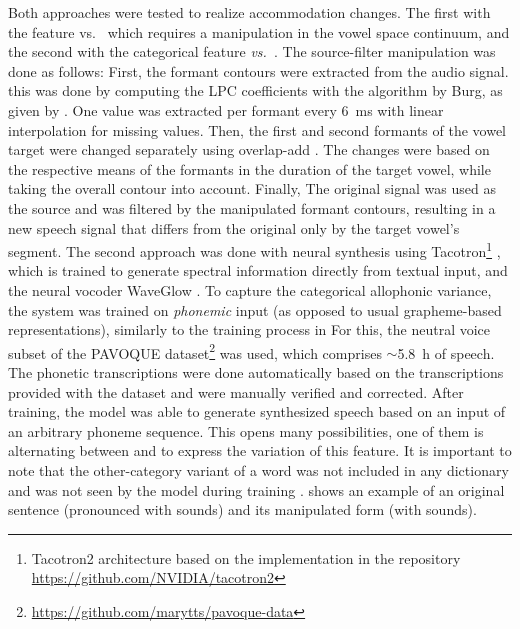 Both approaches were tested to realize accommodation changes.
The first with the feature \textipa{[E:]} vs.\ \textipa{[e:]} which requires a manipulation in the vowel space continuum, and the second with the categorical feature \emph{\textipa{[\c{c}]} vs.\ \textipa{[k]}}.
The source-filter manipulation was done as follows:
First, the formant contours were extracted from the audio signal.
this was done by computing the LPC coefficients with the algorithm by Burg, as given by \citet{Press1989numerical}.
One value was extracted per formant every \SI{6}{\milli\second} with linear interpolation for missing values.
Then, the first and second formants of the vowel target were changed separately using overlap-add \citep{Hamon1989diphone}.
The changes were based on the respective means of the formants in the duration of the target vowel, while taking the overall contour into account.
Finally, The original signal was used as the source and was filtered by the manipulated formant contours, resulting in a new speech signal that differs from the original only by the target vowel's segment.
The second approach was done with neural synthesis using Tacotron\footnote{Tacotron2 architecture based on the implementation in the repository \url{https://github.com/NVIDIA/tacotron2}} \citep{Shen2018natural}, which is trained to generate spectral information directly from textual input, and the neural vocoder WaveGlow \citep{Prenger2019WaveGlow}.
To capture the categorical allophonic variance, the system was trained on \emph{phonemic} input (as opposed to usual grapheme-based representations), similarly to the training process in \citet{Fong2019comparison}
For this, the neutral voice subset of the PAVOQUE dataset\footnote{\url{https://github.com/marytts/pavoque-data}} \citep{Steiner2013pavoque} was used, which comprises $\sim$\SI{5.8}{\hour} of speech.
The phonetic transcriptions were done automatically based on the transcriptions provided with the dataset and were manually verified and corrected.
After training, the model was able to generate synthesized speech based on an input of an arbitrary phoneme sequence.
This opens many possibilities, one of them is alternating between \textipa{[\c{c}]} and \textipa{[k]} to express the variation of this feature.
It is important to note that the other-category variant of a word was not included in any dictionary and was not seen by the model during training \citep[and see][for more details]{Raveh2021ICASSP}.
 shows an example of an original sentence (pronounced with \textipa{[\c{c}]} sounds) and its manipulated form (with \textipa{[k]} sounds).